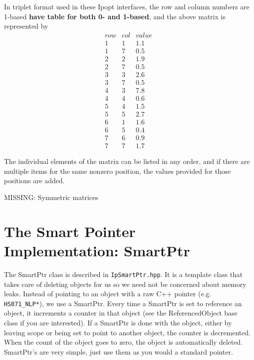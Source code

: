 \documentclass[letter,10pt]{article}
\begin{document}
{In triplet format used in these Ipopt interfaces, the row and column
numbers are 1-based {\bf have table for both 0- and 1-based}, and the
above matrix is represented by
\[
\begin{array}{ccc}
row     &       col     &       value \\
1       &       1       &       1.1     \\
1       &       7       &       0.5     \\
2       &       2       &       1.9     \\
2       &       7       &       0.5     \\
3       &       3       &       2.6     \\
3       &       7       &       0.5     \\
4       &       3       &       7.8     \\
4       &       4       &       0.6     \\
5       &       4       &       1.5     \\
5       &       5       &       2.7     \\
6       &       1       &       1.6     \\
6       &       5       &       0.4     \\
7       &       6       &       0.9     \\
7       &       7       &       1.7
\end{array}
\]

The individual elements of the matrix can be listed in any order, and
if there are multiple items for the same nonzero position, the values
provided for those positions are added.

MISSING: Symmetric matrices


\section{The Smart Pointer Implementation: SmartPtr} \label{app.smart_ptr}

The SmartPtr class is described in {\tt IpSmartPtr.hpp}. It is a
template class that takes care of deleting objects for us so we need
not be concerned about memory leaks. Instead of pointing to an object
with a raw C++ pointer (e.g. {\tt HS071\_NLP*}), we use a SmartPtr.
Every time a SmartPtr is set to reference an object, it increments a
counter in that object (see the ReferencedObject base class if you are
interested). If a SmartPtr is done with the object, either by leaving
scope or being set to point to another object, the counter is
decremented. When the count of the object goes to zero, the object is
automatically deleted. SmartPtr's are very simple, just use them as
you would a standard pointer.

}
\end{document}
